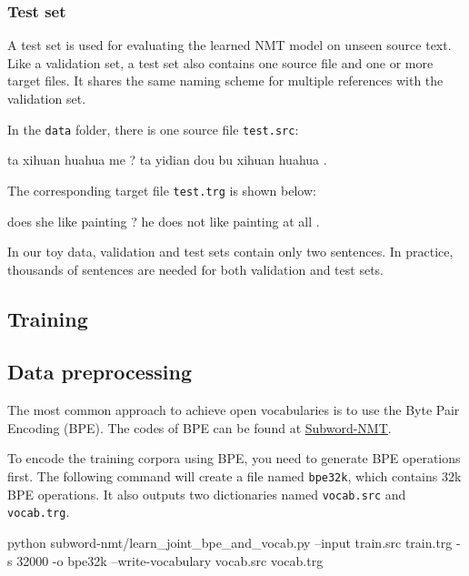 \documentclass{article}
\begin{document}
\subsubsection{Test set}
A test set is used for evaluating the learned NMT model on unseen source text. Like a validation set, a test set also contains one source file and one or more target files. It shares the same naming scheme for multiple references with the validation set.

In the \verb|data| folder, there is one source file \verb|test.src|:
\begin{everbatim}
ta xihuan huahua me ?
ta yidian dou bu xihuan huahua .
\end{everbatim}

The corresponding target file \verb|test.trg| is shown below:
\begin{everbatim}
does she like painting ?
he does not like painting at all .
\end{everbatim}

In our toy data, validation and test sets contain only two sentences. In practice, thousands of sentences are needed for both validation and test sets.

\subsection{Training}

\subsection{Data preprocessing}
The most common approach to achieve open vocabularies is to use the Byte Pair Encoding (BPE). The codes of BPE can be found at \href{https://github.com/rsennrich/subword-nmt}{Subword-NMT}.

To encode the training corpora using BPE, you need to generate BPE operations first. The following command will create a file named \verb|bpe32k|, which contains 32k BPE operations. It also outputs two dictionaries named \verb|vocab.src| and \verb|vocab.trg|.
\begin{everbatim}
python subword-nmt/learn_joint_bpe_and_vocab.py
  --input train.src train.trg -s 32000 -o bpe32k
  --write-vocabulary vocab.src vocab.trg
\end{everbatim}
\end{document}
